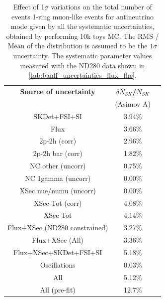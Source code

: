 \begin{table}[htb]
\centering
\begin{tabular}{| c | c | c |}
\hline
  {\bf Source of uncertainty}    & \multicolumn{1}{c|}{{\bf ${\delta}N_{SK}$/$N_{SK}$}}\\
                                 & \multicolumn{1}{c|}{(Asimov A)}\\

\hline
\hline  SKDet+FSI+SI                   & 3.94\%                        \\
\hline
  Flux                           & 3.66\%                        \\
\hline
\hline
  2p-2h (corr)                     & 2.96\%                        \\
  2p-2h bar (corr)                  & 1.82\%                        \\
  NC other (uncorr)              & 0.75\%                        \\
  NC 1gamma (uncorr)             & 0.00\%                        \\
  XSec nue/numu (uncorr)                 & 0.00\%                        \\
\hline
  XSec Tot (corr)                  & 4.08\%                        \\
  XSec Tot                       & 4.14\%                        \\
\hline
\hline
  Flux+XSec (ND280 constrained)                      & 3.27\%                        \\
  Flux+XSec  (All)                    & 3.36\%                        \\
\hline
  Flux+XSec+SKDet+FSI+SI         & 5.18\%                        \\
\hline
\hline
  Oscillations                   & 0.03\%                        \\
\hline
\hline
  All                            & 5.12\%                        \\
      All (pre-fit) 		& 12.7\%				\\
\hline
\hline
\end{tabular} 
\caption{
 Effect of 1$\sigma$ variations on the total number of events 1-ring muon-like events for antineutrino mode
 given by all the systematic uncertainties, obtained by performing 10k toys MC.
The RMS / Mean of the distribution is assumed to be the $1\sigma$ uncertainty.
The systematic parameter values measured with the ND280 data 
shown in 
\cref{tab:banff_uncertainties_flux_fhc},
}
\end{table}
